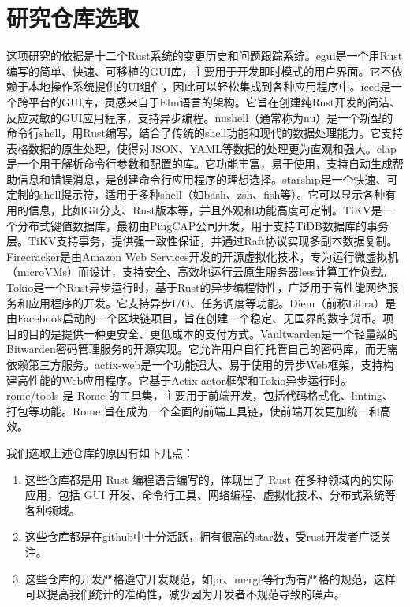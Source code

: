 \section{研究仓库选取}  
这项研究的依据是十二个Rust系统的变更历史和问题跟踪系统。egui是一个用Rust编写的简单、快速、可移植的GUI库，主要用于开发即时模式的用户界面。它不依赖于本地操作系统提供的UI组件，因此可以轻松集成到各种应用程序中。iced是一个跨平台的GUI库，灵感来自于Elm语言的架构。它旨在创建纯Rust开发的简洁、反应灵敏的GUI应用程序，支持异步编程。nushell（通常称为nu）是一个新型的命令行shell，用Rust编写，结合了传统的shell功能和现代的数据处理能力。它支持表格数据的原生处理，使得对JSON、YAML等数据的处理更为直观和强大。clap是一个用于解析命令行参数和配置的库。它功能丰富，易于使用，支持自动生成帮助信息和错误消息，是创建命令行应用程序的理想选择。starship是一个快速、可定制的shell提示符，适用于多种shell（如bash、zsh、fish等）。它可以显示各种有用的信息，比如Git分支、Rust版本等，并且外观和功能高度可定制。TiKV是一个分布式键值数据库，最初由PingCAP公司开发，用于支持TiDB数据库的事务层。TiKV支持事务，提供强一致性保证，并通过Raft协议\cite{ongaro2014search}实现多副本数据复制。Firecracker是由Amazon Web Services开发的开源虚拟化技术，专为运行微虚拟机（microVMs）而设计，支持安全、高效地运行云原生服务器less计算工作负载。Tokio是一个Rust异步运行时，基于Rust的异步编程特性，广泛用于高性能网络服务和应用程序的开发。它支持异步I/O、任务调度等功能。Diem（前称Libra）是由Facebook启动的一个区块链项目，旨在创建一个稳定、无国界的数字货币。项目的目的是提供一种更安全、更低成本的支付方式。Vaultwarden是一个轻量级的Bitwarden密码管理服务的开源实现。它允许用户自行托管自己的密码库，而无需依赖第三方服务。actix-web是一个功能强大、易于使用的异步Web框架，支持构建高性能的Web应用程序。它基于Actix actor框架和Tokio异步运行时。rome/tools 是 Rome 的工具集，主要用于前端开发，包括代码格式化、linting、打包等功能。Rome 旨在成为一个全面的前端工具链，使前端开发更加统一和高效。

我们选取上述仓库的原因有如下几点：
\begin{enumerate}
    \item 这些仓库都是用 Rust 编程语言编写的，体现出了 Rust 在多种领域内的实际应用，包括 GUI 开发、命令行工具、网络编程、虚拟化技术、分布式系统等各种领域。
    \item 这些仓库都是在github中十分活跃，拥有很高的star数，受rust开发者广泛关注。
    \item 这些仓库的开发严格遵守开发规范，如pr、merge等行为有严格的规范，这样可以提高我们统计的准确性，减少因为开发者不规范导致的噪声。
\end{enumerate}

